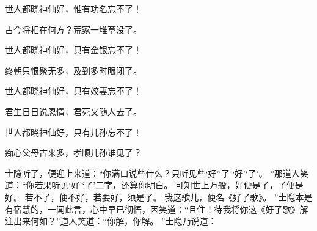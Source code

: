 \hop
 世人都晓神仙好，惟有功名忘不了！\par
 古今将相在何方？荒冢一堆草没了。
\par
 世人都晓神仙好，只有金银忘不了！\par
 终朝只恨聚无多，及到多时眼闭了。
\par
 世人都晓神仙好，只有姣妻忘不了！\par
 君生日日说恩情，君死又随人去了。
\par
 世人都晓神仙好，只有儿孙忘不了！\par
 痴心父母古来多，孝顺儿孙谁见了？ \par
 \hop
士隐听了，便迎上来道：“你满口说些什么？只听见些‘好’‘了’‘好’‘了’。
”那道人笑道：“你若果听见‘好’‘了’二字，还算你明白。
可知世上万般，好便是了，了便是好。
若不了，便不好，若要好，须是了。
我这歌儿，便名《好了歌》。
”士隐本是有宿慧的，一闻此言，心中早已彻悟，因笑道：“且住！待我将你这《好了歌》解注出来何如？”道人笑道：“你解，你解。
”士隐乃说道：
\hop

